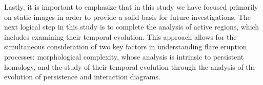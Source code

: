 Lastly, it is important to emphasize that in this study we have focused primarily on static images in order to provide a solid basis for future investigations. The next logical step in this study is to complete the analysis of active regions, which includes examining their temporal evolution. This approach allows for the simultaneous consideration of two key factors in understanding flare eruption processes: morphological complexity, whose analysis is intrinsic to persistent homology, and the study of their temporal evolution through the analysis of the evolution of persistence and interaction diagrams.
